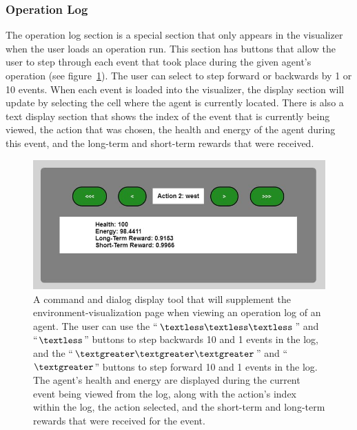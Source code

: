 \subsubsection{Operation Log}
The operation log section is a special section that only appears in the visualizer when the user loads an operation run.
This section has buttons that allow the user to step through each event that took place during the given agent's operation (see figure~\ref{fig:operation_controls}).
The user can select to step forward or backwards by 1 or 10 events.
When each event is loaded into the visualizer, the display section will update by selecting the cell where the agent is currently located.
There is also a text display section that shows the index of the event that is currently being viewed, the action that was chosen, the health and energy of the agent during this event, and the long-term and short-term rewards that were received.

\begin{figure}[!htb]
  \centering
  \includegraphics[width=0.725\columnwidth]{Figures/Visualizer/operation_controls.JPG}
  \caption[GUI Operation View Tool]{A command and dialog display tool that will supplement the environment-visualization page when viewing an operation log of an agent. The user can use the ``$\textless\textless\textless$'' and ``$\textless$'' buttons to step backwards 10 and 1 events in the log, and the ``$\textgreater\textgreater\textgreater$'' and ``$\textgreater$'' buttons to step forward 10 and 1 events in the log. The agent's health and energy are displayed during the current event being viewed from the log, along with the action's index within the log, the action selected, and the short-term and long-term rewards that were received for the event.}
  \label{fig:operation_controls}
\end{figure}
